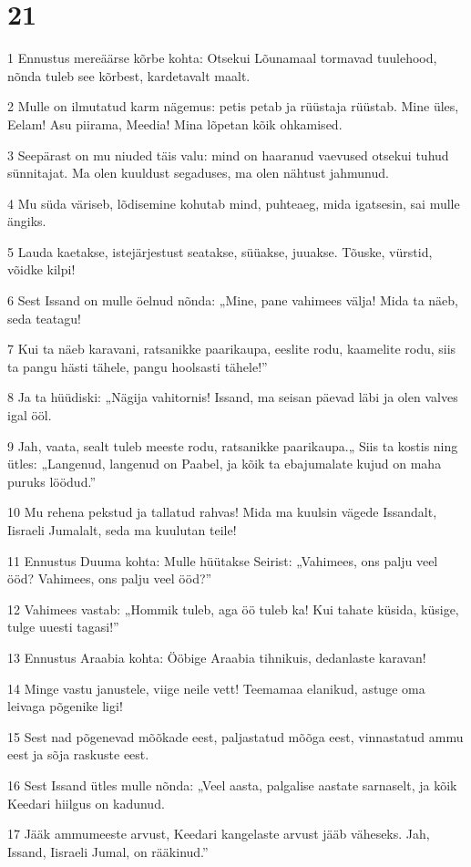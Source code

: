 \chapter{21}

\par 1 Ennustus mereäärse kõrbe kohta: Otsekui Lõunamaal tormavad tuulehood, nõnda tuleb see kõrbest, kardetavalt maalt.
\par 2 Mulle on ilmutatud karm nägemus: petis petab ja rüüstaja rüüstab. Mine üles, Eelam! Asu piirama, Meedia! Mina lõpetan kõik ohkamised.
\par 3 Seepärast on mu niuded täis valu: mind on haaranud vaevused otsekui tuhud sünnitajat. Ma olen kuuldust segaduses, ma olen nähtust jahmunud.
\par 4 Mu süda väriseb, lõdisemine kohutab mind, puhteaeg, mida igatsesin, sai mulle ängiks.
\par 5 Lauda kaetakse, istejärjestust seatakse, süüakse, juuakse. Tõuske, vürstid, võidke kilpi!
\par 6 Sest Issand on mulle öelnud nõnda: „Mine, pane vahimees välja! Mida ta näeb, seda teatagu!
\par 7 Kui ta näeb karavani, ratsanikke paarikaupa, eeslite rodu, kaamelite rodu, siis ta pangu hästi tähele, pangu hoolsasti tähele!”
\par 8 Ja ta hüüdiski: „Nägija vahitornis! Issand, ma seisan päevad läbi ja olen valves igal ööl.
\par 9 Jah, vaata, sealt tuleb meeste rodu, ratsanikke paarikaupa.„ Siis ta kostis ning ütles: „Langenud, langenud on Paabel, ja kõik ta ebajumalate kujud on maha puruks löödud.”
\par 10 Mu rehena pekstud ja tallatud rahvas! Mida ma kuulsin vägede Issandalt, Iisraeli Jumalalt, seda ma kuulutan teile!
\par 11 Ennustus Duuma kohta: Mulle hüütakse Seirist: „Vahimees, ons palju veel ööd? Vahimees, ons palju veel ööd?”
\par 12 Vahimees vastab: „Hommik tuleb, aga öö tuleb ka! Kui tahate küsida, küsige, tulge uuesti tagasi!”
\par 13 Ennustus Araabia kohta: Ööbige Araabia tihnikuis, dedanlaste karavan!
\par 14 Minge vastu janustele, viige neile vett! Teemamaa elanikud, astuge oma leivaga põgenike ligi!
\par 15 Sest nad põgenevad mõõkade eest, paljastatud mõõga eest, vinnastatud ammu eest ja sõja raskuste eest.
\par 16 Sest Issand ütles mulle nõnda: „Veel aasta, palgalise aastate sarnaselt, ja kõik Keedari hiilgus on kadunud.
\par 17 Jääk ammumeeste arvust, Keedari kangelaste arvust jääb väheseks. Jah, Issand, Iisraeli Jumal, on rääkinud.”

